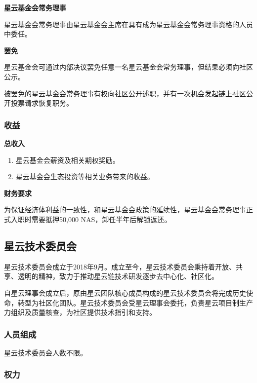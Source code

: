 \textbf{星云基金会常务理事}

星云基金会常务理事由星云基金会主席在具有成为星云基金会常务理事资格的人员中委任。

\vspace{2em}

\textbf{罢免}

星云基金会可通过内部决议罢免任意一名星云基金会常务理事，但结果必须向社区公示。

被罢免的星云基金会常务理事有权向社区公开述职，并有一次机会发起链上社区公开投票请求恢复职务。

\subsubsection{收益}

\textbf{总收入}

\begin{enumerate}
	\item 星云基金会薪资及相关期权奖励。
    \item 星云基金会生态投资等相关业务带来的收益。
\end{enumerate}

\vspace{2em}

\textbf{财务要求}

为保证经济体利益的一致性，和星云基金会政策的延续性，星云基金会常务理事正式入职时需要抵押50,000 NAS，卸任半年后解锁返还。

\subsection{星云技术委员会}

星云技术委员会成立于2018年9月。成立至今，星云技术委员会秉持着开放、共享、透明的精神，致力于推动星云链技术研发逐步去中心化、社区化。

自星云理事会成立后，原由星云团队核心成员构成的星云技术委员会将完成历史使命，转型为社区化团队。星云技术委员会受星云理事会委托，负责星云项目制生产力组织及质量核查，为社区提供技术指引和支持。

\subsubsection{人员组成}

星云技术委员会人数不限。

\subsubsection{权力}

